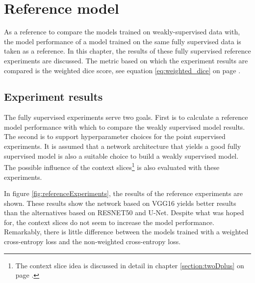 \chapter{Reference model\label{sec:reference_model}}
\par{
    As a reference to compare the models trained on weakly-supervised data with, the model performance of a model trained on the same fully supervised data is taken as a reference.
    In this chapter, the results of these fully supervised reference experiments are discussed.
    The metric based on which the experiment results are compared is the weighted dice score, see equation \ref{eq:weighted_dice} on page \pageref{eq:weighted_dice}.
}

\section{Experiment results}
\par{
    The fully supervised experiments serve two goals.
    First is to calculate a reference model performance with which to compare the weakly supervised model results.
    The second is to support hyperparameter choices for the point supervised experiments.
    It is assumed that a network architecture that yields a good fully supervised model is also a suitable choice to build a weakly supervised model.
    The possible influence of the context slices\footnote{The context slice idea is discussed in detail in chapter \ref{section:twoDplus} on page \pageref{section:twoDplus}.} is also evaluated with these experiments.
}
\par{
    In figure \ref{fig:referenceExperiments}, the results of the reference experiments are shown.
    These results show the network based on VGG16 yields better results than the alternatives based on RESNET50 and U-Net.
    Despite what was hoped for, the context slices do not seem to increase the model performance.
    Remarkably, there is little difference between the models trained with a weighted cross-entropy loss and the non-weighted cross-entropy loss.
}
